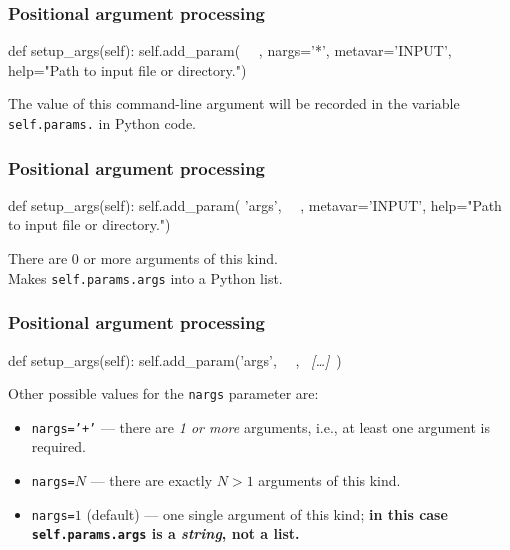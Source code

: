 \documentclass[english,serif,mathserif,xcolor=pdftex,dvipsnames,table]{beamer}
\begin{document}
\begin{frame}[fragile]
  \frametitle{Positional argument processing}

\begin{python}
  def setup_args(self):
    self.add_param(
      ~~, nargs='*', metavar='INPUT',
      help="Path to input file or directory.")
\end{python}

  \+
  The value of this command-line argument will be recorded in the
  variable \texttt{self.params.} in Python code.
\end{frame}


\begin{frame}[fragile]
  \frametitle{Positional argument processing}

\begin{python}
  def setup_args(self):
    self.add_param(
      'args', ~~, metavar='INPUT',
      help="Path to input file or directory.")
\end{python}

  \+
  There are 0 or more arguments of this kind.  \\
  Makes \lstinline|self.params.args| into a Python list.
\end{frame}


\begin{frame}[fragile]
  \frametitle{Positional argument processing}

\begin{python}
  def setup_args(self):
    self.add_param('args', ~~, ~{\em [\ldots]}~)
\end{python}

  \+
  Other possible values for the \texttt{nargs} parameter are:
  \begin{itemize}
  \item \texttt{nargs='+'} --- there are \emph{1 or more} arguments,
    i.e., at least one argument is required.
  \item \texttt{nargs=$N$} --- there are exactly $N > 1$ arguments of this kind.
  \item \texttt{nargs=$1$} (default) --- one single argument of this
    kind; \textbf{in this case \lstinline|self.params.args| is a
    \emph{string}, not a list.}
  \end{itemize}
\end{frame}
\end{document}

